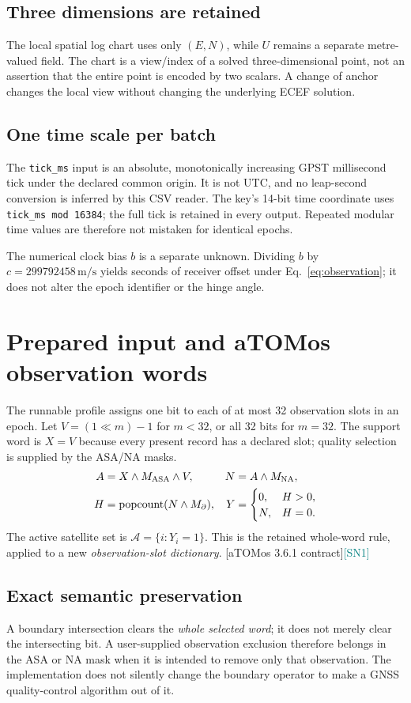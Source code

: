\documentclass[11pt,a4paper]{article}
\newcommand{\code}[1]{\texttt{#1}}
\newcommand{\aRef}{\textcolor{muted}{[aTOMos 3.6.1 contract]}}
\newcommand{\newprofile}{\textcolor{teal}{[SN1]}}
\newcommand{\pop}{\operatorname{popcount}}
\begin{document}
\subsection{Three dimensions are retained}
The local spatial log chart uses only $(E,N)$, while $U$ remains a separate metre-valued field.
The chart is a view/index of a solved three-dimensional point, not an assertion that the entire point is encoded
by two scalars. A change of anchor changes the local view without changing the underlying ECEF solution.

\subsection{One time scale per batch}
The \code{tick\_ms} input is an absolute, monotonically increasing GPST millisecond tick under the declared
common origin. It is not UTC, and no leap-second conversion is inferred by this CSV reader.
The key's 14-bit time coordinate uses \code{tick\_ms mod 16384}; the full tick is retained in every output.
Repeated modular time values are therefore not mistaken for identical epochs.

The numerical clock bias $b$ is a separate unknown. Dividing $b$ by $c=299792458\,\mathrm{m/s}$ yields
seconds of receiver offset under Eq.~\eqref{eq:observation}; it does not alter the epoch identifier or the hinge angle.
\clearpage

\section{Prepared input and aTOMos observation words}
The runnable profile assigns one bit to each of at most 32 observation slots in an epoch.
Let $V=(1\ll m)-1$ for $m<32$, or all 32 bits for $m=32$. The support word is $X=V$ because every
present record has a declared slot; quality selection is supplied by the ASA/NA masks.
\begin{align}
A&=X\land M_{\rm ASA}\land V,& N&=A\land M_{\rm NA},\\
H&=\pop(N\land M_{\partial}),&Y&=\begin{cases}0,&H>0,\\N,&H=0.\end{cases}
\end{align}
The active satellite set is $\mathcal A=\{i:Y_i=1\}$. This is the retained whole-word rule, applied to a
new \emph{observation-slot dictionary}. \aRef\newprofile

\subsection{Exact semantic preservation}
A boundary intersection clears the \emph{whole selected word}; it does not merely clear the intersecting bit.
A user-supplied observation exclusion therefore belongs in the ASA or NA mask when it is intended to remove
only that observation. The implementation does not silently change the boundary operator to make a GNSS
quality-control algorithm out of it.
\end{document}

